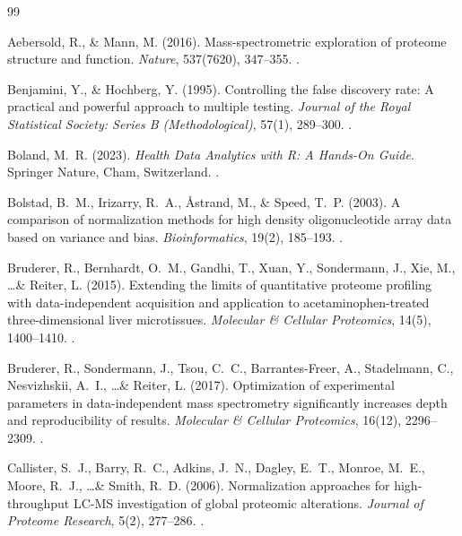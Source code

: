 \documentclass[11pt,oneside]{book}
\begin{document}
\begin{thebibliography}{99}

Aebersold, R., \& Mann, M. (2016). Mass-spectrometric exploration of proteome structure and function. \textit{Nature}, 537(7620), 347--355. .

Benjamini, Y., \& Hochberg, Y. (1995). Controlling the false discovery rate: A practical and powerful approach to multiple testing. \textit{Journal of the Royal Statistical Society: Series B (Methodological)}, 57(1), 289--300. .

Boland, M.~R. (2023). \textit{Health Data Analytics with R: A Hands-On Guide}. Springer Nature, Cham, Switzerland. .

Bolstad, B.~M., Irizarry, R.~A., {\AA}strand, M., \& Speed, T.~P. (2003). A comparison of normalization methods for high density oligonucleotide array data based on variance and bias. \textit{Bioinformatics}, 19(2), 185--193. .

Bruderer, R., Bernhardt, O.~M., Gandhi, T., Xuan, Y., Sondermann, J., Xie, M., \dots \& Reiter, L. (2015). Extending the limits of quantitative proteome profiling with data-independent acquisition and application to acetaminophen-treated three-dimensional liver microtissues. \textit{Molecular \& Cellular Proteomics}, 14(5), 1400--1410. .

Bruderer, R., Sondermann, J., Tsou, C.~C., Barrantes-Freer, A., Stadelmann, C., Nesvizhskii, A.~I., \dots \& Reiter, L. (2017). Optimization of experimental parameters in data-independent mass spectrometry significantly increases depth and reproducibility of results. \textit{Molecular \& Cellular Proteomics}, 16(12), 2296--2309. .

Callister, S.~J., Barry, R.~C., Adkins, J.~N., Dagley, E.~T., Monroe, M.~E., Moore, R.~J., \dots \& Smith, R.~D. (2006). Normalization approaches for high-throughput LC-MS investigation of global proteomic alterations. \textit{Journal of Proteome Research}, 5(2), 277--286. .


\end{thebibliography}
\end{document}
